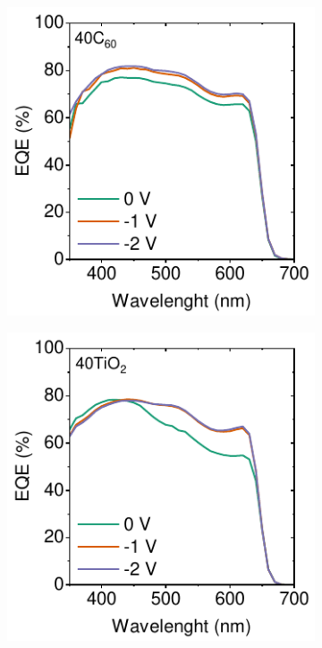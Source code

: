\begin{figure}[htbp]
    \centering
    \begin{subfigure}{0.32\textwidth}
        \centering
        \includegraphics[width=\textwidth]{chapters/transport_layers/images/EQE_40C60.pdf}
        \caption{}
        \label{}
    \end{subfigure}
    \hfill
    \begin{subfigure}{0.32\textwidth}
        \centering
        \includegraphics[width=\textwidth]{chapters/transport_layers/images/EQE_40TiO2.pdf}

\end{subfigure}
\end{figure}

